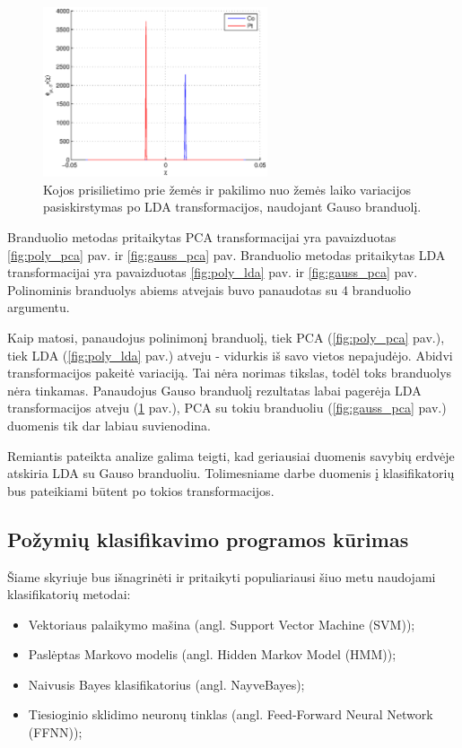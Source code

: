 \documentclass[]{vgtuef}
\begin{document}
\begin{figure}[!t]
  \centering
  \includegraphics[width=250px]{figures/st_sw_gauss_gda.eps}
  \caption{Kojos prisilietimo prie žemės ir pakilimo nuo žemės laiko
    variacijos pasiskirstymas po LDA transformacijos, naudojant Gauso branduolį.}
  \label{fig:gauss_lda}
\end{figure}

Branduolio metodas pritaikytas PCA transformacijai yra pavaizduotas
\ref{fig:poly_pca} pav. ir \ref{fig:gauss_pca} pav. Branduolio metodas
pritaikytas LDA transformacijai yra pavaizduotas \ref{fig:poly_lda}
pav. ir \ref{fig:gauss_pca} pav. Polinominis branduolys abiems
atvejais buvo panaudotas su 4 branduolio argumentu.

Kaip matosi, panaudojus polinimonį branduolį, tiek PCA (\ref{fig:poly_pca}
pav.), tiek LDA (\ref{fig:poly_lda} pav.) atveju - vidurkis iš savo
vietos nepajudėjo. Abidvi transformacijos pakeitė variaciją. Tai nėra
norimas tikslas, todėl toks branduolys nėra tinkamas. Panaudojus Gauso
branduolį rezultatas labai pagerėja LDA transformacijos atveju
(\ref{fig:gauss_lda} pav.), PCA su tokiu branduoliu
(\ref{fig:gauss_pca} pav.) duomenis tik dar labiau suvienodina.

Remiantis pateikta analize galima teigti, kad geriausiai duomenis
savybių erdvėje atskiria LDA su Gauso branduoliu. Tolimesniame darbe
duomenis į klasifikatorių bus pateikiami būtent po tokios transformacijos.

\subsection{Požymių klasifikavimo programos kūrimas}

Šiame skyriuje bus išnagrinėti ir pritaikyti populiariausi šiuo metu
naudojami klasifikatorių metodai:

\begin{itemize}
\item Vektoriaus palaikymo mašina (angl. Support Vector Machine
  (SVM));
\item Paslėptas Markovo modelis (angl. Hidden Markov Model (HMM));
\item Naivusis Bayes klasifikatorius (angl. NayveBayes);
\item Tiesioginio sklidimo neuronų tinklas (angl. Feed-Forward Neural
  Network (FFNN));
\end{itemize}
\end{document}
